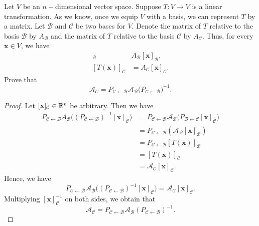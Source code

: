 \documentclass[a4paper]{article}
\begin{document}
\begin{problem}
    Let \( V  \) be an \( n- \)dimensional vector space. Suppose \( T : V \to  V \) is a linear transformation. As we know, once we equip \( V  \) with a basis, we can represent \( T  \) by a matrix. Let \( \mathcal{B} \) and \( \mathcal{C} \) be two bases for \( V  \). Denote the matrix of \( T  \) relative to the basis \( \mathcal{B} \) by \( {A}_{\mathcal{B}} \) and the matrix of \( T  \) relative to the basis \( \mathcal{C } \) by \( {A}_{\mathcal{C}} \). Thus, for every \( \mathbf{x} \in V \), we have 
    \begin{align*}
        [T(\mathbf{x})]_{\mathcal{B}} & {A}_{\mathcal{B}} [\mathbf{x}]_{\mathcal{B}}, \\
        [T(\mathbf{x})]_{\mathcal{C}} &= {A}_{\mathcal{C}} [\mathbf{x}]_{\mathcal{C}}.
    \end{align*}
    Prove that 
    \[  {\mathcal{A}}_{\mathcal{C}} = P_{\mathcal{C} \leftarrow \mathcal{B} } {\mathcal{A}}_{\mathcal{B}} \Big( {P}_{\mathcal{C} \leftarrow \mathcal{B}}  \Big)^{-1}. \]
\end{problem}
\begin{proof}
    Let \( [\mathbf{x}]_{\mathcal{C}} \in \mathbb{R}^{n} \) be arbitrary. Then we have 
    \begin{align*}
        {P}_{\mathcal{C} \leftarrow \mathcal{B}} {A}_{\mathcal{B}} \Big( ({P}_{\mathcal{C} \leftarrow \mathcal{B}})^{-1} [\mathbf{x}]_{\mathcal{C}} \Big) &= {P}_{\mathcal{C } \leftarrow \mathcal{B}} {\mathcal{A}}_{\mathcal{B}} \Big( {P}_{\mathcal{B} \leftarrow \mathcal{C}} [\mathbf{x}]_{\mathcal{C}}  \Big) \\
                                                                                                                                                          &= {P}_{\mathcal{C} \leftarrow \mathcal{B}} ({\mathcal{A}}_{\mathcal{B}} [\mathbf{x}]_{\mathcal{B}} ) \\
                                                                                                                                                          &= {P}_{\mathcal{C} \leftarrow \mathcal{B}} [T(\mathbf{x})]_{\mathcal{B}} \\
                                                                                                                                                          &= [T(\mathbf{x})]_{\mathcal{C}} \\
                                                                                                                                                          &= {\mathcal{A}}_{\mathcal{C}} [\mathbf{x}]_{\mathcal{C}}.
    \end{align*}
    Hence, we have
    \[{P}_{\mathcal{C} \leftarrow  \mathcal{B}} {\mathcal{A}}_{\mathcal{B}} \Big(  ({P}_{\mathcal{C} \leftarrow \mathcal{B}})^{-1} [\mathbf{x}]_{\mathcal{C}} \Big) = {\mathcal{A}}_{\mathcal{C}} [\mathbf{x}]_{\mathcal{C}}.\]
    Multiplying \( [\mathbf{x}]_{\mathcal{C}}^{-1} \) on both sides, we obtain that 
    \[ {\mathcal{A}}_{\mathcal{C}} = {P}_{\mathcal{C} \leftarrow \mathcal{B}} {\mathcal{A}}_{\mathcal{B}} ({P}_{\mathcal{C} \leftarrow \mathcal{B}} )^{-1}. \]
\end{proof}
\end{document}
